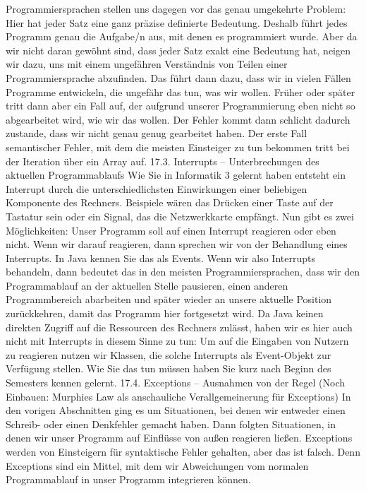 Programmiersprachen stellen uns dagegen vor das genau umgekehrte Problem: Hier hat jeder Satz eine ganz präzise definierte Bedeutung. Deshalb führt jedes Programm genau die Aufgabe/n aus, mit denen es programmiert wurde. Aber da wir nicht daran gewöhnt sind, dass jeder Satz exakt eine Bedeutung hat, neigen wir dazu, uns mit einem ungefähren Verständnis von Teilen einer Programmiersprache abzufinden. Das führt dann dazu, dass wir in vielen Fällen Programme entwickeln, die ungefähr das tun, was wir wollen. Früher oder später tritt dann aber ein Fall auf, der aufgrund unserer Programmierung eben nicht so abgearbeitet wird, wie wir das wollen. Der Fehler kommt dann schlicht dadurch zustande, dass wir nicht genau genug gearbeitet haben. Der erste Fall semantischer Fehler, mit dem die meisten Einsteiger zu tun bekommen tritt bei der Iteration über ein Array auf.
17.3.	Interrupts – Unterbrechungen des aktuellen Programmablaufs
Wie Sie in Informatik 3 gelernt haben entsteht ein Interrupt durch die unterschiedlichsten Einwirkungen einer beliebigen Komponente des Rechners. Beispiele wären das Drücken einer Taste auf der Tastatur sein oder ein Signal, das die Netzwerkkarte empfängt.
Nun gibt es zwei Möglichkeiten: Unser Programm soll auf einen Interrupt reagieren oder eben nicht. Wenn wir darauf reagieren, dann sprechen wir von der Behandlung eines Interrupts. In Java kennen Sie das als Events.
Wenn wir also Interrupts behandeln, dann bedeutet das in den meisten Programmiersprachen, dass wir den Programmablauf an der aktuellen Stelle pausieren, einen anderen Programmbereich abarbeiten und später wieder an unsere aktuelle Position zurückkehren, damit das Programm hier fortgesetzt wird. Da Java keinen direkten Zugriff auf die Ressourcen des Rechners zulässt, haben wir es hier auch nicht mit Interrupts in diesem Sinne zu tun: Um auf die Eingaben von Nutzern zu reagieren nutzen wir Klassen, die solche Interrupts als Event-Objekt zur Verfügung stellen. Wie Sie das tun müssen haben Sie kurz nach Beginn des Semesters kennen gelernt.
17.4.	Exceptions – Ausnahmen von der Regel
(Noch Einbauen: Murphies Law als anschauliche Verallgemeinerung für Exceptions)
In den vorigen Abschnitten ging es um Situationen, bei denen wir entweder einen Schreib- oder einen Denkfehler gemacht haben. Dann folgten Situationen, in denen wir unser Programm auf Einflüsse von außen reagieren ließen. Exceptions werden von Einsteigern für syntaktische Fehler gehalten, aber das ist falsch. Denn Exceptions sind ein Mittel, mit dem wir Abweichungen vom normalen Programmablauf in unser Programm integrieren können.
